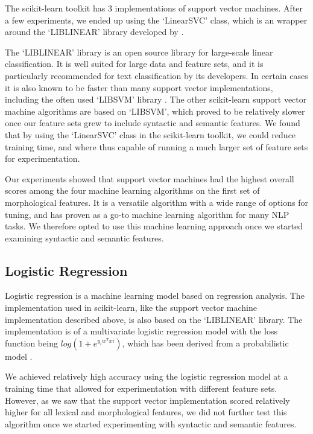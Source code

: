 The scikit-learn toolkit has 3 implementations of support vector machines. After a few experiments, we ended up using the `LinearSVC' class, which is an wrapper around the `LIBLINEAR' library developed by  .

The `LIBLINEAR' library is an open source library for large-scale linear classification. It is well suited for large data and feature sets, and it is particularly recommended for text classification by its developers. In certain cases it is also known to be faster than many support vector implementations, including the often used `LIBSVM' library \cite{liblinear}. The other scikit-learn support vector machine algorithms are based on `LIBSVM', which proved to be relatively slower once our feature sets grew to include syntactic and semantic features. We found that by using the `LinearSVC' class in the scikit-learn toolkit, we could reduce training time, and where thus capable of running a much larger set of feature sets for experimentation.

Our experiments showed that support vector machines had the highest overall scores among the four machine learning algorithms on the first set of morphological features. It is a versatile algorithm with a wide range of options for tuning, and has proven as a go-to machine learning algorithm for many NLP tasks. We therefore opted to use this machine learning approach once we started examining syntactic and semantic features.

\subsection{Logistic Regression}

Logistic regression is a machine learning model based on regression analysis. The implementation used in scikit-learn, like the support vector machine implementation described above, is also based on the `LIBLINEAR' library. The implementation is of a multivariate logistic regression model with the loss function being $log(1+e^{y_iw^Txi})$, which has been derived from a probabilistic model \cite{liblinear}. 

We achieved relatively high accuracy using the logistic regression model at a training time that allowed for experimentation with different feature sets. However, as we saw that the support vector implementation scored relatively higher for all lexical and morphological features, we did not further test this algorithm once we started experimenting with syntactic and semantic features.

